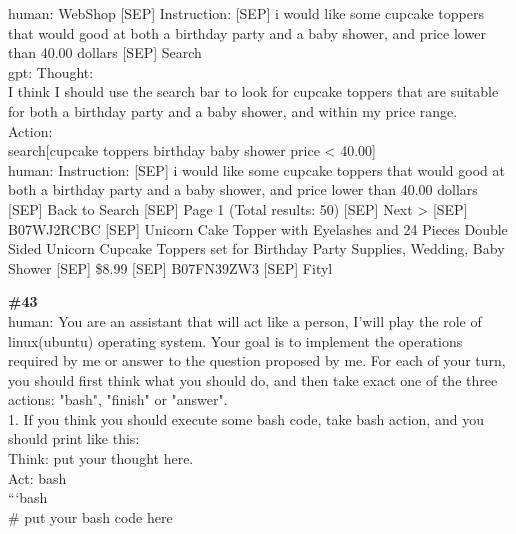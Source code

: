 \documentclass[10pt]{article}
\begin{document}
\begin{Form}
\begin{tcolorbox}[colback=convbg,colframe=itemframe,boxrule=0.8pt,arc=2pt,breakable,left=6pt,right=6pt,top=5pt,bottom=5pt]
{human: WebShop [SEP] Instruction: [SEP] i would like some cupcake toppers that would good at both a birthday party and a baby shower, and price lower than 40.00 dollars [SEP] Search \\[2pt]
gpt: Thought: \\[2pt]
I think I should use the search bar to look for cupcake toppers that are suitable for both a birthday party and a baby shower, and within my price range. \\[2pt]
Action: \\[2pt]
search[cupcake toppers birthday baby shower price < 40.00] \\[2pt]
human: Instruction: [SEP] i would like some cupcake toppers that would good at both a birthday party and a baby shower, and price lower than 40.00 dollars [SEP] Back to Search [SEP] Page 1 (Total results: 50) [SEP] Next > [SEP] B07WJ2RCBC [SEP] Unicorn Cake Topper with Eyelashes and 24 Pieces Double Sided Unicorn Cupcake Toppers set for Birthday Party Supplies, Wedding, Baby Shower [SEP] \$8.99 [SEP] B07FN39ZW3 [SEP] Fityl}
\end{tcolorbox}
\vspace{-1pt}
\CheckBox[name=q42c,width=1.6ex,height=1.6ex,bordercolor={0.45 0.45 0.45}]{~\textcolor{cbox}{COMPACT}}\quad
\CheckBox[name=q42d,width=1.6ex,height=1.6ex,bordercolor={0.45 0.45 0.45}]{~\textcolor{dbox}{DIFFUSE}}\quad
\CheckBox[name=q42n,width=1.6ex,height=1.6ex,bordercolor={0.45 0.45 0.45}]{~\textcolor{nbox}{NONE}}
\vspace{8pt}
\begin{tcolorbox}[colback=convbg,colframe=itemframe,boxrule=0.8pt,arc=2pt,breakable,left=6pt,right=6pt,top=5pt,bottom=5pt]
{\footnotesize\textbf{\#43}}\\[3pt]
{\footnotesize human: You are an assistant that will act like a person, I'will play the role of linux(ubuntu) operating system. Your goal is to implement the operations required by me or answer to the question proposed by me. For each of your turn, you should first think what you should do, and then take exact one of the three actions: "bash", "finish" or "answer". \\[2pt]
1. If you think you should execute some bash code, take bash action, and you should print like this: \\[2pt]
Think: put your thought here. \\[2pt]
Act: bash \\[2pt]
```bash \\[2pt]
\# put your bash code here \\[2pt]
}
\end{tcolorbox}
\end{Form}
\end{document}

